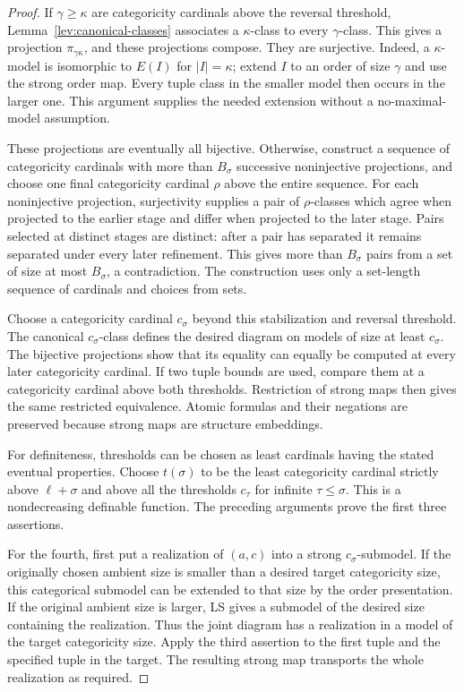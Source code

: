 \begin{proof}
If \(\gamma\ge\kappa\) are categoricity cardinals above the reversal
threshold, Lemma~\ref{lev:canonical-classes} associates a
\(\kappa\)-class to every \(\gamma\)-class. This gives a projection
\(\pi_{\gamma\kappa}\), and these projections compose. They are
surjective. Indeed, a \(\kappa\)-model is isomorphic to \(E(I)\) for
\(|I|=\kappa\); extend \(I\) to an order of size \(\gamma\) and use
the strong order map. Every tuple class in the smaller model then
occurs in the larger one. This argument supplies the needed extension
without a no-maximal-model assumption.

These projections are eventually all bijective. Otherwise, construct
a sequence of categoricity cardinals with more than \(B_\sigma\)
successive noninjective projections, and choose one final
categoricity cardinal \(\rho\) above the entire sequence. For each
noninjective projection, surjectivity supplies a pair of
\(\rho\)-classes which agree when projected to the earlier stage and
differ when projected to the later stage. Pairs selected at distinct
stages are distinct: after a pair has separated it remains separated
under every later refinement. This gives more than
\(B_\sigma\) pairs from a set of size at most \(B_\sigma\), a
contradiction. The construction uses only a set-length sequence of
cardinals and choices from sets.

Choose a categoricity cardinal \(c_\sigma\) beyond this stabilization
and reversal threshold. The canonical \(c_\sigma\)-class defines
the desired diagram on models of size at least \(c_\sigma\).
The bijective projections show that its equality can equally be
computed at every later categoricity cardinal. If two tuple bounds
are used, compare them at a categoricity cardinal above both
thresholds. Restriction of strong maps then gives the same
restricted equivalence. Atomic formulas and their negations are
preserved because strong maps are structure embeddings.

For definiteness, thresholds can be chosen as least cardinals having
the stated eventual properties. Choose \(t(\sigma)\) to be the
least categoricity cardinal strictly above \(\ell+\sigma\) and
above all the thresholds \(c_\tau\) for infinite \(\tau\le\sigma\).
This is a nondecreasing definable function. The preceding arguments
prove the first three assertions.

For the fourth, first put a realization of \((a,c)\) into a strong
\(c_\sigma\)-submodel. If the originally chosen ambient size is
smaller than a desired target categoricity size, this categorical
submodel can be extended to that size by the order presentation.
If the original ambient size is larger, LS gives a submodel of the
desired size containing the realization. Thus the joint diagram
has a realization in a model of the target categoricity size.
Apply the third assertion to the first tuple and the specified tuple
in the target. The resulting strong map transports the whole
realization as required.
\end{proof}

